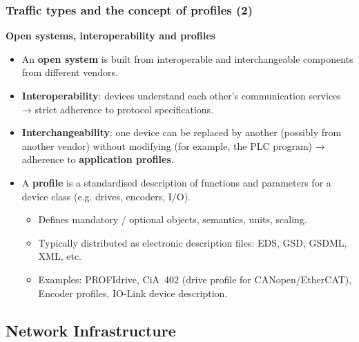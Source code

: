 \begin{frame}
	\frametitle{Traffic types and the concept of profiles (2)}
	\small
	\textbf{Open systems, interoperability and profiles}
	\begin{itemize}
		\item An \textbf{open system} is built from interoperable and interchangeable
			components from different vendors.
		\item \textbf{Interoperability}: devices understand each other’s communication
			services → strict adherence to protocol specifications.
		\item \textbf{Interchangeability}: one device can be replaced by another
			(possibly from another vendor) without modifying (for example, the PLC program) → adherence to \textbf{application profiles}.
		\item A \textbf{profile} is a standardised description of functions and
			parameters for a device class (e.g. drives, encoders, I/O).
		\begin{itemize}
			\item Defines mandatory / optional objects, semantics, units, scaling.
			\item Typically distributed as electronic description files:
				EDS, GSD, GSDML, XML, etc.
			\item Examples: PROFIdrive, CiA~402 (drive profile for CANopen/EtherCAT),
				Encoder profiles, IO-Link device description.
		\end{itemize}
	\end{itemize}
\end{frame}

\subsection{Network Infrastructure}

